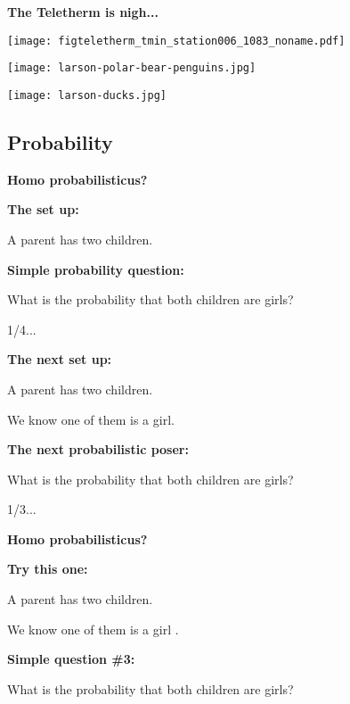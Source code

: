 

  \textbf{The Teletherm is nigh...}
    \begin{center}
      \texttt{[image: figteletherm\_tmin\_station006\_1083\_noname.pdf]}
    \end{center}
  


  
\texttt{[image: larson-polar-bear-penguins.jpg]}


  
\texttt{[image: larson-ducks.jpg]}



\subsection{Probability}

\textbf{Homo probabilisticus?}

\textbf{The set up:}
  
  
    A parent has two children.
  


\textbf{Simple probability question:}
  
  
    What is the probability that both
    children are girls?
  
    {\alert{1/4...}}
  


\textbf{The next set up:}
  
  
    A parent has two children.
  
    We know one of them is a girl.
  


\textbf{The next probabilistic poser:}
  
  
    What is the probability that both
    children are girls?
  
    {\alert{1/3...}}
  



  \textbf{Homo probabilisticus?}

  \textbf{Try this one:}
    
    
      A parent has two children.
    
      We know one of them is a girl .
    
  
  
  \textbf{Simple question \#3:}
    
    
      What is the probability that both
      children are girls?
    
